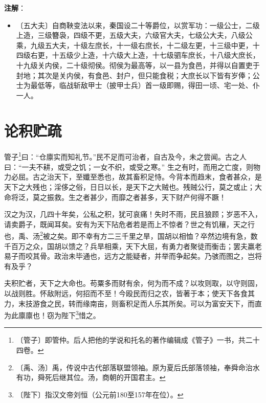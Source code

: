 \documentclass[12pt,UTF-8,openany,a4]{ctexbook}
\begin{document}
\newpage

\begin{Large}
   \noindent \textbf{注解}：
\end{Large}

\vspace{-1em}

\begin{itemize}
    \setlength\itemsep{-0.2em}
    \item〔五大夫〕{\yiwen 自商鞅变法以来，秦国设二十等爵位，以赏军功：一级公士，二级上造，三级簪袅，四级不更，五级大夫，六级官大夫，七级公大夫，八级公乘，九级五大夫，十级左庶长，十一级右庶长，十二级左更，十三级中更，十四级右更，十五级少上造，十六级大上造，十七级驷车庶长，十八级大庶长，十九级关内侯，二十级彻侯。彻侯为最高等，以一县为食邑，并得以自置吏于封地；其次是关内侯，有食邑、封户，但只能食税；大庶长以下皆有岁俸；公士为最低等，临战斩敌甲士（披甲士兵）首一级即赐，得田一顷、宅一处、仆一人。}
\end{itemize}

\chapter{论积贮疏}

\begin{large}
    
    管子\footnote{〔管子〕\yiwen 即管仲。后人把他的学说和托名的著作编辑成《管子》一书，共二十四卷。}曰：“仓廪实而知礼节。”民不足而可治者，自古及今，未之尝闻。古之人曰：“一夫不耕，或受之饥；一女不织，或受之寒。” 生之有时，而用之亡度，则物力必屈。古之治天下，至孅至悉也，故其畜积足恃。今背本而趋末，食者甚众，是天下之大残也；淫侈之俗，日日以长，是天下之大贼也。残贼公行，莫之或止；大命将泛，莫之振救。生之者甚少，而靡之者甚多，天下财产何得不蹶！
    
    汉之为汉，几四十年矣，公私之积，犹可哀痛！失时不雨，民且狼顾；岁恶不入，请卖爵子，既闻耳矣。安有为天下阽危者若是而上不惊者？世之有饥穰，天之行也，禹、汤\footnote{〔禹、汤〕\yiwen 禹，传说中古代部落联盟领袖。原为夏后氏部落领袖，奉舜命治水有功，舜死后继其位。汤，商朝的开国君主。}被之矣。即不幸有方二三千里之旱，国胡以相恤？卒然边境有急，数千百万之众，国胡以馈之？兵旱相乘，天下大屈，有勇力者聚徒而衡击；罢夫羸老易子而咬其骨。政治未毕通也，远方之能疑者，并举而争起矣。乃骇而图之，岂将有及乎？
    
    夫积贮者，天下之大命也。苟粟多而财有余，何为而不成？以攻则取，以守则固，以战则胜。怀敌附远，何招而不至！今殴民而归之农，皆著于本；使天下各食其力，末技游食之民，转而缘南亩，则畜积足而人乐其所矣。可以为富安天下，而直为此廪廪也！窃为陛下\footnote{〔陛下〕\yiwen 指汉文帝刘恒（公元前180至157年在位）。}惜之。

\end{large}
\end{document}
